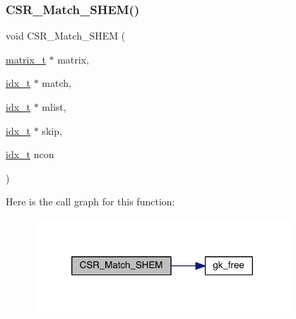 \subsubsection{\texorpdfstring{C\+S\+R\+\_\+\+Match\+\_\+\+S\+H\+E\+M()}{CSR\_Match\_SHEM()}}
{\footnotesize\ttfamily void C\+S\+R\+\_\+\+Match\+\_\+\+S\+H\+EM (\begin{DoxyParamCaption}\item[{\hyperlink{a00754}{matrix\+\_\+t} $\ast$}]{matrix,  }\item[{\hyperlink{a00876_aaa5262be3e700770163401acb0150f52}{idx\+\_\+t} $\ast$}]{match,  }\item[{\hyperlink{a00876_aaa5262be3e700770163401acb0150f52}{idx\+\_\+t} $\ast$}]{mlist,  }\item[{\hyperlink{a00876_aaa5262be3e700770163401acb0150f52}{idx\+\_\+t} $\ast$}]{skip,  }\item[{\hyperlink{a00876_aaa5262be3e700770163401acb0150f52}{idx\+\_\+t}}]{ncon }\end{DoxyParamCaption})}

Here is the call graph for this function\+:\nopagebreak
\begin{figure}[H]
\begin{center}
\leavevmode
\includegraphics[width=272pt]{a00347_a7171b4b1ffd62a2ebee9863c25f73652_cgraph}
\end{center}
\end{figure}
